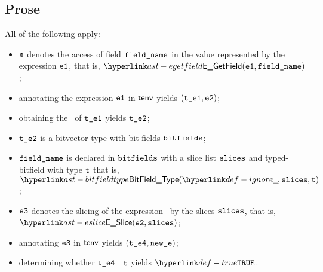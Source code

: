 \subsection{Prose}
All of the following apply:
\begin{itemize}
  \item $\texttt{e}$ denotes the access of field $\texttt{field\_name}$ in the value represented by the expression $\texttt{e1}$, that is, $\EGetField(\veone, \fieldname)$;
  \item annotating the expression $\texttt{e1}$ in $\textsf{tenv}$ yields $(\texttt{t\_e1}, \texttt{e2})$\ProseOrTypeError;
  \item obtaining the \underlyingtype\ of $\texttt{t\_e1}$ yields $\texttt{t\_e2}$\ProseOrTypeError;
  \item $\texttt{t\_e2}$ is a bitvector type with bit fields $\texttt{bitfields}$;
  \item $\texttt{field\_name}$ is declared in $\texttt{bitfields}$ with a slice list $\texttt{slices}$ and typed-bitfield with type $\texttt{t}$ that is,
        $\BitFieldType(\Ignore, \slices, \vt)$;
  \item $\texttt{e3}$ denotes the slicing of the expression \vetwo\ by the slices $\texttt{slices}$, that is, \\ $\ESlice(\vetwo, \slices)$;
  \item annotating $\texttt{e3}$ in $\textsf{tenv}$ yields $(\texttt{t\_e4}, \texttt{new\_e})$\ProseOrTypeError;
  \item determining whether $\texttt{t\_e4}$ \typesatisfies\ $\texttt{t}$ yields $\True$\ProseOrTypeError.
\end{itemize}



